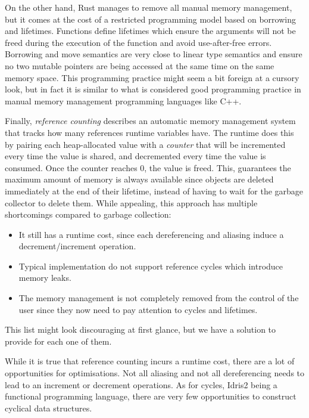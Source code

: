 \documentclass[
]{article}
\providecommand{\tightlist}{%
  \setlength{\itemsep}{0pt}\setlength{\parskip}{0pt}}
\begin{document}
On the other hand, Rust \cite{rust} manages to remove all manual memory
management, but it comes at the cost of a restricted programming model
based on borrowing and lifetimes. Functions define lifetimes which
ensure the arguments will not be freed during the execution of the
function and avoid use-after-free errors. Borrowing and move semantics
are very close to linear type semantics and ensure no two mutable
pointers are being accessed at the same time on the same memory space.
This programming practice might seem a bit foreign at a cursory look,
but in fact it is similar to what is considered good programming
practice in manual memory management programming languages like C++.

Finally, \emph{reference counting} describes an automatic memory
management system that tracks how many references runtime variables
have. The runtime does this by pairing each heap-allocated value with a
\emph{counter} that will be incremented every time the value is shared,
and decremented every time the value is consumed. Once the counter
reaches 0, the value is freed. This, guarantees the maximum amount of
memory is always available since objects are deleted immediately at the
end of their lifetime, instead of having to wait for the garbage
collector to delete them. While appealing, this approach has multiple
shortcomings compared to garbage collection:

\begin{itemize}
\tightlist
\item
  It still has a runtime cost, since each dereferencing and aliasing
  induce a decrement/increment operation.
\item
  Typical implementation do not support reference cycles which introduce
  memory leaks.
\item
  The memory management is not completely removed from the control of
  the user since they now need to pay attention to cycles and lifetimes.
\end{itemize}

This list might look discouraging at first glance, but we have a
solution to provide for each one of them.

While it is true that reference counting incurs a runtime cost, there
are a lot of opportunities for optimisations. Not all aliasing and not
all dereferencing needs to lead to an increment or decrement operations.
As for cycles, Idris2 being a functional programming language, there are
very few opportunities to construct cyclical data structures.
\end{document}
